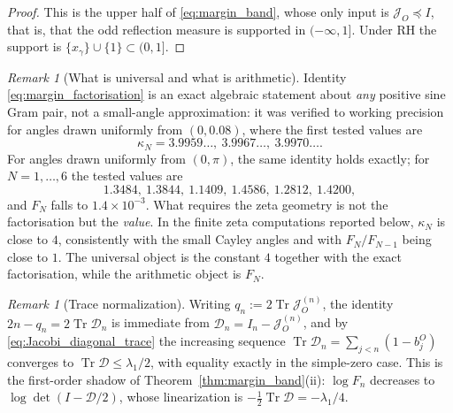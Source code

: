 \documentclass[11pt]{amsart}
\numberwithin{equation}{section}
\theoremstyle{plain}
\theoremstyle{definition}
\theoremstyle{remark}
\newtheorem{remark}[theorem]{Remark}
\newcommand{\RH}{\mathrm{RH}}
\newcommand{\Tr}{\operatorname{Tr}}
\begin{document}
\begin{proof}
This is the upper half of \eqref{eq:margin_band}, whose only input is $\mathcal J_O\preceq I$,
that is, that the odd reflection measure is supported in $(-\infty,1]$.  Under $\RH$ the
support is $\{x_\gamma\}\cup\{1\}\subset(0,1]$.
\end{proof}

\begin{remark}[What is universal and what is arithmetic]
\label{rem:kappa_universal_vs_arithmetic}
Identity \eqref{eq:margin_factorisation} is an exact algebraic statement about \emph{any}
positive sine Gram pair, not a small-angle approximation: it was verified to working
precision for angles drawn uniformly from $(0,0.08)$, where the first tested values are
\[
\kappa_N=3.9959\ldots,\ 3.9967\ldots,\ 3.9970\ldots .
\]
For angles drawn uniformly from $(0,\pi)$, the same identity holds exactly; for $N=1,\ldots,6$ the
tested values are
\[
1.3484,\ 1.3844,\ 1.1409,\ 1.4586,\ 1.2812,\ 1.4200,
\]
and $F_N$ falls to $1.4\times10^{-3}$.  What requires the zeta geometry is not the factorisation but the \emph{value}.  In the finite
zeta computations reported below, $\kappa_N$ is close to $4$, consistently with the small Cayley
angles and with $F_N/F_{N-1}$ being close to $1$.  The universal object is the constant $4$
together with the exact factorisation, while the arithmetic object is $F_N$.
\end{remark}



\begin{remark}[Trace normalization]
\label{rem:trace_normalisation}
Writing $q_n:=2\Tr\mathcal J_O^{(n)}$, the identity $2n-q_n=2\Tr\mathcal D_n$ is immediate from
$\mathcal D_n=I_n-\mathcal J_O^{(n)}$, and by \eqref{eq:Jacobi_diagonal_trace} the increasing sequence
$\Tr\mathcal D_n=\sum_{j<n}(1-b_j^O)$ converges to $\Tr\mathcal D\le\lambda_1/2$, with equality exactly in the simple-zero case.  This is the
first-order shadow of Theorem~\ref{thm:margin_band}(ii): $\log F_n$ decreases to
$\log\det(I-\mathcal D/2)$, whose linearization is $-\tfrac12\Tr\mathcal D=-\lambda_1/4$.
\end{remark}
\end{document}
